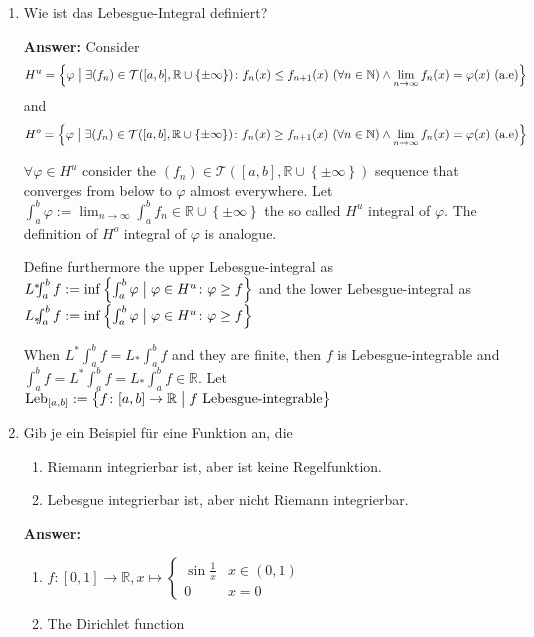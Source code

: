 \documentclass[11pt]{article}
\newcommand{\RR}[0]{\mathbb{R}}
\newcommand{\NN}[0]{\mathbb{N}}
\DeclareMathOperator{\Leb}{Leb}
\begin{document}
\begin{enumerate}
    \item Wie ist das Lebesgue-Integral definiert?

    \textbf{Answer:} Consider $$H^u = \left\{\varphi \bigm| \exists (f_n) \in \mathcal{T}([a, b], \RR \cup \left\{\pm\infty\right\})\colon f_n(x) \le f_{n+1}(x)~(\forall n \in \NN) \land \lim_{n\to\infty}f_n(x) = \varphi(x)~(\text{a.e}) \right\} $$ and $$H^o = \left\{\varphi \bigm| \exists (f_n) \in \mathcal{T}([a, b], \RR \cup \left\{\pm\infty\right\})\colon f_n(x) \ge f_{n+1}(x)~(\forall n \in \NN) \land \lim_{n\to\infty}f_n(x) = \varphi(x)~(\text{a.e}) \right\} $$

    $\forall \varphi \in H^u$ consider the $(f_n) \in \mathcal{T}([a, b], \RR \cup \left\{\pm\infty\right\})$ sequence that converges from below to $\varphi$ almost everywhere. Let $\int_a^b \varphi := \lim_{n\to\infty}\int_a^b f_n \in \RR \cup \left\{\pm\infty\right\}$ the so called $H^u$ integral of $\varphi$. The definition of $H^o$ integral of $\varphi$ is analogue.

    Define furthermore the upper Lebesgue-integral as $L^*\!\!\!\int_a^b f := \inf\left\{\int_a^b \varphi \bigm| \varphi \in H^u\colon \varphi \ge f\right\}$ and the lower Lebesgue-integral as $L_*\!\!\!\int_a^b f := \inf\left\{\int_a^b \varphi \bigm| \varphi \in H^u\colon \varphi \ge f\right\}$

    When $L^*\!\!\!\int_a^b f = L_*\!\!\!\int_a^b f$ and they are finite, then $f$ is Lebesgue-integrable and $\int_a^b f = L^*\!\!\!\int_a^b f = L_*\!\!\!\int_a^b f \in \RR$. Let $\Leb_{[a, b]} := \left\{f\colon[a, b]\to \RR \bigm| f\text{ Lebesgue-integrable}\right\}$

    \item Gib je ein Beispiel für eine Funktion an, die
    \begin{enumerate}
        \item Riemann integrierbar ist, aber ist keine Regelfunktion.
        \item Lebesgue integrierbar ist, aber nicht Riemann integrierbar.
    \end{enumerate}

    \textbf{Answer:}
    \begin{enumerate}
        \item $f\colon [0, 1] \to \RR, x \mapsto \begin{cases}
            \sin{\frac{1}{x}}&x \in (0, 1)\\
            0&x=0
        \end{cases}$
        \item The Dirichlet function
    \end{enumerate}


\end{enumerate}
\end{document}
